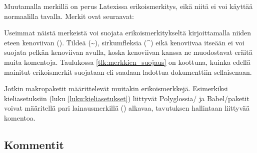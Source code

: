 Muutamalla merkillä on perus Latexissa erikoismerkitys, eikä niitä ei
voi käyttää normaalilla tavalla. Merkit ovat seuraavat:

\begin{koodilohkosis}
\end{koodilohkosis}

Useimmat näistä merkeistä voi suojata erikoismerkitykseltä
kirjoittamalla niiden eteen kenoviivan (\keno). Tildeä
(\textasciitilde), sirkumfleksia (\textasciicircum) eikä kenoviivaa
itseään ei voi suojata pelkän kenoviivan avulla, koska kenoviivan kanssa
ne muodostavat eräitä muita komentoja. Taulukossa
\ref{tlk:merkkien_suojaus} on koottuna, kuinka edellä mainitut
erikoismerkit suojataan eli saadaan ladottua dokumenttiin sellaisenaan.


Jotkin makropaketit määrittelevät muitakin erikoismerkkejä. Esimerkiksi
kieli\-asetuksiin (luku \ref{luku:kieliasetukset}) liittyvät
Polyglossia\-/{} ja Babel\-/paketit voivat määritellä pari
lainausmerkillä (\koodi{\textquotedbl}) alkavaa, tavutuksen hallintaan
liittyvää komentoa.

\subsection{Kommentit}

